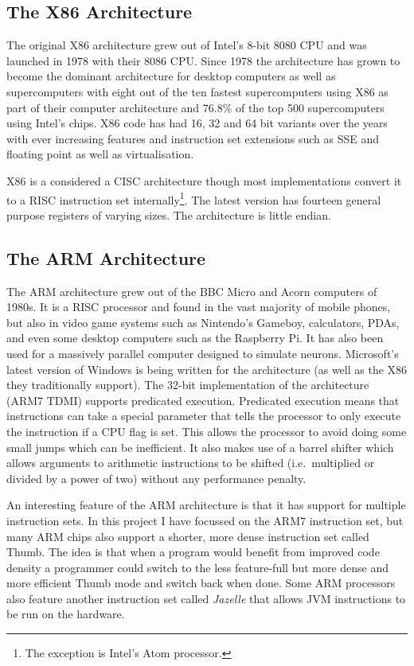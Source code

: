 \documentclass[10pt]{book}
\begin{document}
\subsection{The X86 Architecture}

The original X86 architecture grew out of Intel's 8-bit 8080 CPU and was
launched in 1978 with their 8086 CPU. Since 1978 the architecture has
grown to become the dominant architecture for desktop computers as well
as supercomputers with eight out of the ten fastest supercomputers using
X86 as part of their computer architecture and 76.8\% of the top 500
supercomputers using Intel's chips\autocite{top500}. X86 code has had
16, 32 and 64 bit variants over the years with ever increasing features
and instruction set extensions such as SSE and floating point as well as
virtualisation\autocite{IntelCorporation:2011wn}.

X86 is a considered a CISC architecture though most implementations
convert it to a RISC instruction set internally\footnote{The exception
  is Intel's Atom processor\autocite{Shimpi:2008ul}.}. The latest
version has fourteen general purpose registers of varying sizes. The
architecture is little endian.

\subsection{The ARM Architecture}

The ARM architecture grew out of the BBC Micro and Acorn computers of
1980s. It is a RISC processor and found in the vast majority of mobile
phones\autocite{Krazit:ue}, but also in video game systems such as
Nintendo's Gameboy, calculators, PDAs, and even some desktop computers
such as the Raspberry Pi. It has also been used for a massively parallel
computer designed to simulate neurons\autocite{Khan:2008uv}. Microsoft's
latest version of Windows is being written for the architecture (as well
as the X86 they traditionally support). The 32-bit implementation of the
architecture (ARM7 TDMI) supports predicated execution. Predicated
execution means that instructions can take a special parameter that
tells the processor to only execute the instruction if a CPU flag is
set. This allows the processor to avoid doing some small jumps which can
be inefficient. It also makes use of a barrel shifter which allows
arguments to arithmetic instructions to be shifted (i.e.~multiplied or
divided by a power of two) without any performance penalty.

An interesting feature of the ARM architecture is that it has support
for multiple instruction sets. In this project I have focussed on the
ARM7 instruction set, but many ARM chips also support a shorter, more
dense instruction set called Thumb. The idea is that when a program
would benefit from improved code density a programmer could switch to
the less feature-full but more dense and more efficient Thumb mode and
switch back when done. Some ARM processors also feature another
instruction set called \emph{Jazelle} that allows JVM instructions to be
run on the hardware.
\end{document}
